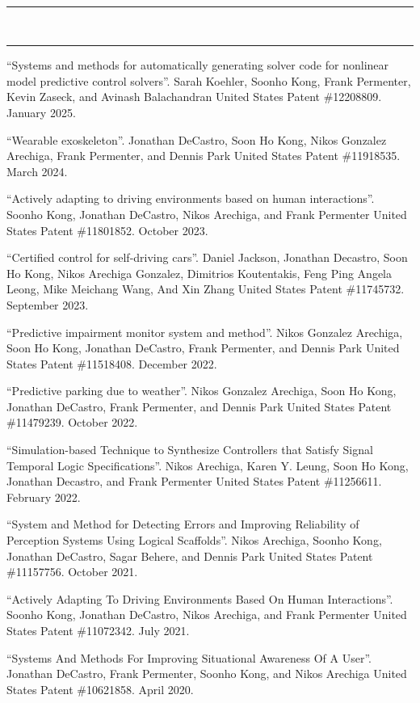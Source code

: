 \documentclass[10pt, letterpaper]{article}
\newcommand{\mysection}[1]{
  \vspace{20pt}\noindent{\rmfamily\mdseries \Large #1}\\
  \vspace{-6pt}\hrule\vspace{3pt}
}
\begin{document}

\mysection{Publications}


\nocite{*}
\printbibliography[heading=none]

\mysection{Patents}

\begin{thebibliography}{9}

 ``Systems and methods for automatically generating solver code for nonlinear model predictive control solvers''.
Sarah Koehler, Soonho Kong, Frank Permenter, Kevin Zaseck, and Avinash Balachandran
United States Patent \#12208809. January 2025.

 ``Wearable exoskeleton''.
Jonathan DeCastro, Soon Ho Kong, Nikos Gonzalez Arechiga, Frank Permenter, and Dennis Park
United States Patent \#11918535. March 2024.

 ``Actively adapting to driving environments based on human interactions''.
Soonho Kong, Jonathan DeCastro, Nikos Arechiga, and Frank Permenter
United States Patent \#11801852. October 2023.

``Certified control for self-driving cars''.
Daniel Jackson, Jonathan Decastro, Soon Ho Kong, Nikos Arechiga Gonzalez, Dimitrios Koutentakis, Feng Ping Angela Leong, Mike Meichang Wang, And Xin Zhang
United States Patent \#11745732. September 2023.

``Predictive impairment monitor system and method''.
Nikos Gonzalez Arechiga, Soon Ho Kong, Jonathan DeCastro, Frank Permenter, and Dennis Park
United States Patent \#11518408. December 2022.

``Predictive parking due to weather''.
Nikos Gonzalez Arechiga, Soon Ho Kong, Jonathan DeCastro, Frank Permenter, and Dennis Park
United States Patent \#11479239. October 2022.

``Simulation-based Technique to Synthesize Controllers that Satisfy Signal Temporal Logic Specifications''.
Nikos Arechiga, Karen Y. Leung, Soon Ho Kong, Jonathan Decastro, and Frank Permenter
United States Patent \#11256611. February 2022.

``System and Method for Detecting Errors and Improving Reliability of Perception Systems Using Logical Scaffolds''.
Nikos Arechiga, Soonho Kong, Jonathan DeCastro, Sagar Behere, and Dennis Park
United States Patent \#11157756. October 2021.

``Actively Adapting To Driving Environments Based On Human Interactions''.
Soonho Kong, Jonathan DeCastro, Nikos Arechiga, and Frank Permenter
United States Patent \#11072342. July 2021.

 ``Systems And Methods For Improving Situational Awareness Of A User''.
Jonathan DeCastro, Frank Permenter, Soonho Kong, and Nikos Arechiga
United States Patent \#10621858. April 2020.

\end{thebibliography}
\end{document}
